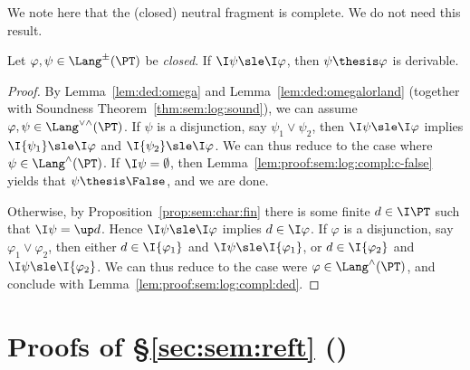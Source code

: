 We note here that the (closed) neutral fragment is complete.
We do not need this result.


\begin{corollary}
Let $\varphi, \psi \in \Lang^\pm(\PT)$ be \emph{closed}.
If $\I\psi \sle \I\varphi$,
then $\psi \thesis \varphi$ is derivable.
\end{corollary}

\begin{proof}
By Lemma~\ref{lem:ded:omega}
and Lemma~\ref{lem:ded:omegalorland}
(together with Soundness Theorem~\ref{thm:sem:log:sound}),
we can assume $\varphi,\psi \in \Lang^{\lor\land}(\PT)$.
%
If $\psi$ is a disjunction, say $\psi_1 \lor \psi_2$,
then $\I\psi \sle \I\varphi$
implies
$\I{\psi_1} \sle \I\varphi$
and
$\I{\psi_2} \sle \I\varphi$.
%
We can thus reduce to the case where $\psi \in \Lang^\land(\PT)$.
If $\I\psi = \emptyset$,
then Lemma~\ref{lem:proof:sem:log:compl:c-false}
yields that $\psi \thesis \False$,
and we are done.

Otherwise, by Proposition~\ref{prop:sem:char:fin}
there is some finite $d \in \I\PT$
such that $\I\psi = \up d$.
Hence $\I\psi \sle \I\varphi$
implies $d \in \I\varphi$.
If $\varphi$ is a disjunction, say $\varphi_1 \lor \varphi_2$,
then either $d \in \I{\varphi_1}$ and $\I\psi \sle \I{\varphi_1}$,
or $d \in \I{\varphi_2}$ and $\I\psi \sle \I{\varphi_2}$.
We can thus reduce to the case were $\varphi \in \Lang^\land(\PT)$,
and conclude with Lemma~\ref{lem:proof:sem:log:compl:ded}.
\end{proof}




\section{Proofs of \S\ref{sec:sem:reft} ()}
\label{sec:proof:sem:reft}

